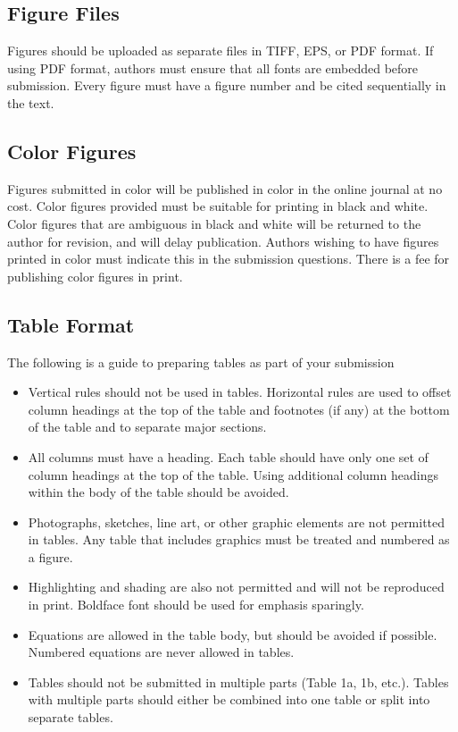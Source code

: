 \documentclass[Journal,letterpaper,NoLineNumbers]{ascelike-new}
\begin{document}
\subsection{Figure Files}

Figures should be uploaded as separate files in TIFF, EPS, or PDF format. If using PDF format, authors must ensure that all fonts are embedded before submission. Every figure must have a figure number and be cited sequentially in the text.

\subsection{Color Figures}

Figures submitted in color will be published in color in the online journal at no cost. Color figures provided must be suitable for printing in black and white. Color figures that are ambiguous in black and white will be returned to the author for revision, and will delay publication. Authors wishing to have figures printed in color must indicate this in the submission questions. There is a fee for publishing color figures in print.

\subsection{Table Format}
The following is a guide to preparing tables as part of your submission
\begin{itemize}
\item Vertical rules should not be used in tables. Horizontal rules are used to offset column headings at the top of the table and footnotes (if any) at the bottom of the table and to separate major sections.
\item All columns must have a heading. Each table should have only one set of column headings at the top of the table. Using additional column headings within the body of the table should be avoided.
\item Photographs, sketches, line art, or other graphic elements are not permitted in tables. Any table that includes graphics must be treated and numbered as a figure.
\item Highlighting and shading are also not permitted and will not be reproduced in print. Boldface font should be used for emphasis sparingly.
\item Equations are allowed in the table body, but should be avoided if possible. Numbered equations are never allowed in tables.
\item Tables should not be submitted in multiple parts (Table 1a, 1b, etc.). Tables with multiple parts should either be combined into one table or split into separate tables.
\end{itemize}
\end{document}
